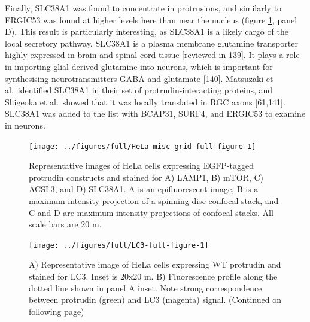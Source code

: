 \documentclass[
  12pt,
  a4paper,
]{book}
\begin{document}
Finally, SLC38A1 was found to concentrate in protrusions, and similarly to ERGIC53 was found at higher levels here than near the nucleus (figure \ref{fig:HeLa-misc-grid-full-figure}, panel D). This result is particularly interesting, as SLC38A1 is a likely cargo of the local secretory pathway. SLC38A1 is a plasma membrane glutamine transporter highly expressed in brain and spinal cord tissue {[}reviewed in 139{]}. It plays a role in importing glial-derived glutamine into neurons, which is important for synthesising neurotransmitters GABA and glutamate {[}140{]}. Matsuzaki et al.~identified SLC38A1 in their set of protrudin-interacting proteins, and Shigeoka et al.~showed that it was locally translated in RGC axons {[}61,141{]}. SLC38A1 was added to the list with BCAP31, SURF4, and ERGIC53 to examine in neurons.

\begin{figure}
\texttt{[image: ../figures/full/HeLa-misc-grid-full-figure-1]} \caption[Protrudin-expressing HeLa cells stained for LAMP1, mTOR, ACSL3, and SLC38A1]{Representative images of HeLa cells expressing EGFP-tagged protrudin constructs and stained  for A) LAMP1, B) mTOR, C) ACSL3, and D) SLC38A1.  A is an epifluorescent image, B is a maximum intensity projection of a spinning disc confocal stack, and C and D are maximum intensity projections of confocal stacks.  All scale bars are 20 \textmu{}m.}\label{fig:HeLa-misc-grid-full-figure}
\end{figure}



\begin{figure}[H]
\texttt{[image: ../figures/full/LC3-full-figure-1]} \caption[Protrudin effect on LC3 localisation in HeLa cells and cortical neurons]{A) Representative image of HeLa cells expressing WT protrudin and stained for LC3. Inset is 20x20 \textmu{}m. B) Fluorescence profile along the dotted line shown in panel A inset. Note strong correspondence between protrudin (green) and LC3 (magenta) signal. (Continued on following page)}\label{fig:LC3-full-figure}
\end{figure}

\begin{figure}[h]
\end{figure}
\end{document}
